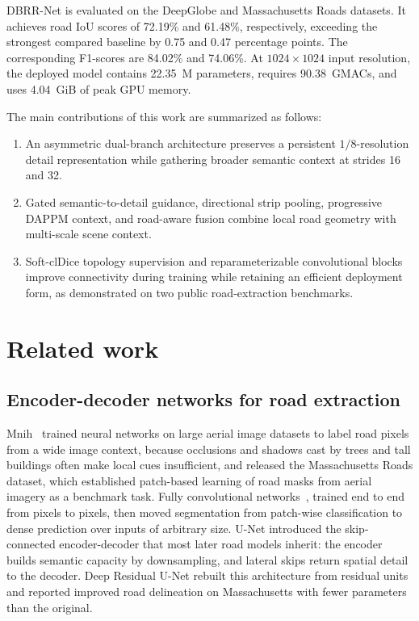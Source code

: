 \documentclass[a4paper,fleqn, review]{cas-sc}
\begin{document}
DBRR-Net is evaluated on the DeepGlobe \cite{demir2018deepglobe} and
Massachusetts Roads \cite{mnih2013aerial} datasets. It achieves road IoU scores
of 72.19\% and 61.48\%, respectively, exceeding the strongest compared baseline
by 0.75 and 0.47 percentage points. The corresponding F1-scores are 84.02\% and
74.06\%. At $1024\times1024$ input resolution, the deployed model contains
22.35~M parameters, requires 90.38~GMACs, and uses 4.04~GiB of peak GPU memory.

The main contributions of this work are summarized as follows:

\begin{enumerate}
\item An asymmetric dual-branch architecture preserves a persistent
      $1/8$-resolution detail representation while gathering broader semantic
      context at strides 16 and 32.
\item Gated semantic-to-detail guidance, directional strip pooling, progressive
      DAPPM context, and road-aware fusion combine local road geometry with
      multi-scale scene context.
\item Soft-clDice topology supervision and reparameterizable convolutional
      blocks improve connectivity during training while retaining an efficient
      deployment form, as demonstrated on two public road-extraction benchmarks.
\end{enumerate}


\section{Related work}
\label{sec:related-work}

\subsection{Encoder-decoder networks for road extraction}
\label{subsec:rw-encdec}

Mnih~\cite{mnih2013aerial} trained neural networks on large aerial image
datasets to label road pixels from a wide image context, because occlusions and
shadows cast by trees and tall buildings often make local cues insufficient,
and released the Massachusetts Roads dataset, which established patch-based
learning of road masks from aerial imagery as a benchmark task. Fully
convolutional networks~\cite{shelhamer2017fcn}, trained end to end from pixels
to pixels, then moved segmentation from patch-wise classification to dense
prediction over inputs of arbitrary size. U-Net
\cite{ronneberger2015unet} introduced the skip-connected encoder-decoder that
most later road models inherit: the encoder builds semantic capacity by
downsampling, and lateral skips return spatial detail to the decoder. Deep
Residual U-Net \cite{zhang2018resunet} rebuilt this architecture from residual
units and reported improved road delineation on Massachusetts with fewer
parameters than the original.
\end{document}
